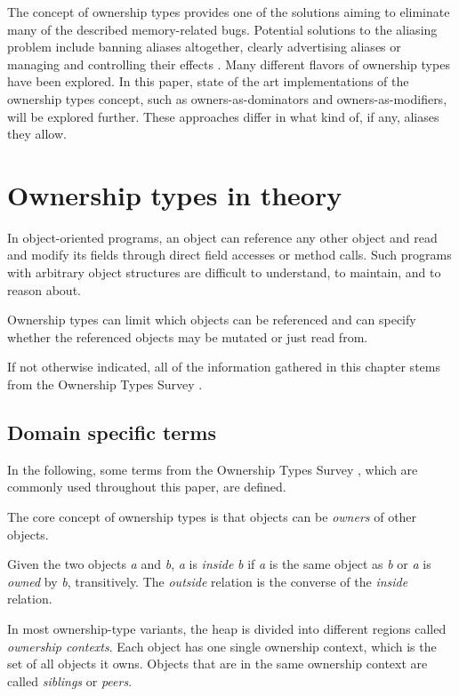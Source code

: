 \documentclass[sigplan,11pt,nonacm]{acmart}
\begin{document}
The concept of ownership types provides one of the solutions aiming to eliminate many of the described memory-related bugs.
Potential solutions to the aliasing problem include banning aliases altogether, clearly advertising aliases or managing and controlling their effects \cite{ownership-types-survey}.
Many different flavors of ownership types have been explored.
In this paper, state of the art implementations of the ownership types concept, such as owners-as-dominators and owners-as-modifiers, will be explored further.
These approaches differ in what kind of, if any, aliases they allow.



\section{Ownership types in theory}
\label{sec:theory}

In object-oriented programs, an object can reference any other object and read and modify its fields through direct field accesses or method calls.
Such programs with arbitrary object structures are difficult to understand, to maintain, and to reason about. \cite{lightweight-ownership}

Ownership types can limit which objects can be referenced and can specify whether the referenced objects may be mutated or just read from.

If not otherwise indicated, all of the information gathered in this chapter stems from the Ownership Types Survey \cite{ownership-types-survey}.


\subsection{Domain specific terms}
\label{sec:domain-specific-terms}

In the following, some terms from the Ownership Types Survey \cite{ownership-types-survey}, which are commonly used throughout this paper, are defined.

The core concept of ownership types is that objects can be \emph{owners} of other objects.

Given the two objects \emph{a} and \emph{b}, \emph{a} is \emph{inside} \emph{b} if \emph{a} is the same object as \emph{b} or \emph{a} is \emph{owned} by \emph{b}, transitively.
The \emph{outside} relation is the converse of the \emph{inside} relation.

In most ownership-type variants, the heap is divided into different regions called \emph{ownership contexts}.
Each object has one single ownership context, which is the set of all objects it owns.
Objects that are in the same ownership context are called \emph{siblings} or \emph{peers}.
\end{document}

